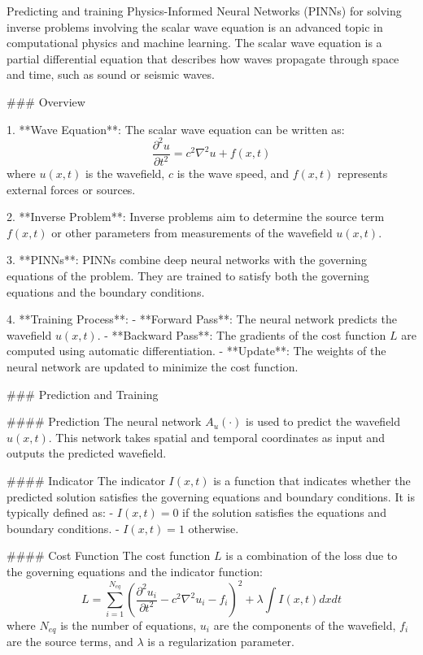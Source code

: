Predicting and training Physics-Informed Neural Networks (PINNs) for solving inverse problems involving the scalar wave equation is an advanced topic in computational physics and machine learning. The scalar wave equation is a partial differential equation that describes how waves propagate through space and time, such as sound or seismic waves.

### Overview

1. **Wave Equation**: The scalar wave equation can be written as:
   \[
   \frac{\partial^2 u}{\partial t^2} = c^2 \nabla^2 u + f(x, t)
   \]
   where \( u(x, t) \) is the wavefield, \( c \) is the wave speed, and \( f(x, t) \) represents external forces or sources.

2. **Inverse Problem**: Inverse problems aim to determine the source term \( f(x, t) \) or other parameters from measurements of the wavefield \( u(x, t) \).

3. **PINNs**: PINNs combine deep neural networks with the governing equations of the problem. They are trained to satisfy both the governing equations and the boundary conditions.

4. **Training Process**:
   - **Forward Pass**: The neural network predicts the wavefield \( u(x, t) \).
   - **Backward Pass**: The gradients of the cost function \( L \) are computed using automatic differentiation.
   - **Update**: The weights of the neural network are updated to minimize the cost function.

### Prediction and Training

#### Prediction
The neural network \( A_u(\cdot) \) is used to predict the wavefield \( u(x, t) \). This network takes spatial and temporal coordinates as input and outputs the predicted wavefield.

#### Indicator
The indicator \( I(x, t) \) is a function that indicates whether the predicted solution satisfies the governing equations and boundary conditions. It is typically defined as:
- \( I(x, t) = 0 \) if the solution satisfies the equations and boundary conditions.
- \( I(x, t) = 1 \) otherwise.

#### Cost Function
The cost function \( L \) is a combination of the loss due to the governing equations and the indicator function:
\[
L = \sum_{i=1}^{N_{eq}} \left( \frac{\partial^2 u_i}{\partial t^2} - c^2 \nabla^2 u_i - f_i \right)^2 + \lambda \int I(x, t) dx dt
\]
where \( N_{eq} \) is the number of equations, \( u_i \) are the components of the wavefield, \( f_i \) are the source terms, and \( \lambda \) is a regularization parameter.

